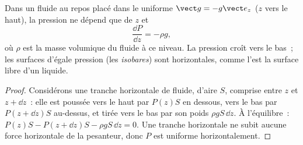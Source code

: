 \begin{theorem}\label{thm:b1:fluid-statics:fundamental}
Dans un fluide au repos placé dans le  uniforme $\vect g = -g\vect e_z$ ($z$
vers le haut), la pression ne dépend que de $z$ et
\[
\frac{\dd P}{\dd z} = -\rho g ,
\]
où $\rho$ est la masse volumique du fluide à ce niveau. La pression croît
vers le bas~; les surfaces d'égale pression (les \emph{isobares}) sont
horizontales, comme l'est la surface libre d'un liquide.
\end{theorem}

\begin{proof}
Considérons une tranche horizontale de fluide, d'aire $S$, comprise entre
$z$ et $z + \dd z$~: elle est poussée vers le haut par $P(z)S$ en dessous,
vers le bas par $P(z + \dd z)S$ au-dessus, et tirée vers le bas par son
poids $\rho gS\,\dd z$. À l'équilibre~:
$P(z)S - P(z + \dd z)S - \rho gS\,\dd z = 0$. Une tranche horizontale ne
subit aucune force horizontale de la pesanteur, donc $P$ est uniforme horizontalement.
\end{proof}

